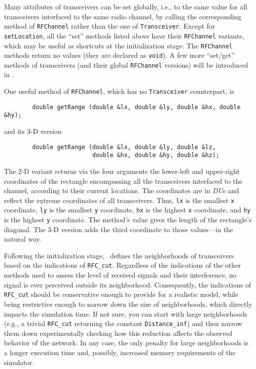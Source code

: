 Many attributes of transceivers can be set globally, i.e., to the same value
for all transceivers interfaced to the same radio channel, by calling the
corresponding method of {\tt RFChannel} rather than the one of
{\tt Transceiver}.
Except for {\tt setLocation}, all the ``set'' methods listed above
have their {\tt RFChannel} variants, which may be useful as shortcuts at the
initialization stage.
The {\tt RFChannel} methods return no values (they are declared as {\tt void}).
A few more ``set/get'' methods of transceivers (and their global 
{\tt RFChannel} versions) will be introduced in .

One useful method of {\tt RFChannel}, which has no
{\tt Transceiver} counterpart, is
\begin{verbatim}
        double getRange (double &lx, double &ly, double &hx, double &hy);
\end{verbatim}
\noindent
and its 3-D version
\begin{verbatim}
        double getRange (double &lx, double &ly, double &lz,
                         double &hx, double &hy, double &hz);
\end{verbatim}
\noindent
The 2-D variant
returns via the four arguments the lower-left and upper-right
coordinates of the rectangle encompassing all the transceivers interfaced
to the channel, according to their current locations.
The coordinates are in {\em DU\/}s and reflect the extreme coordinates of
all transceivers.
Thus, {\tt lx} is the smallest {\tt x} coordinate, {\tt ly} is the smallest
{\tt y} coordinate, {\tt hx} is the highest {\tt x} coordinate, and
{\tt hy} is the highest {\tt y} coordinate.
The method's value gives the length of the rectangle's diagonal.
The 3-D version adds the third coordinate to those values---in the
natural way.

Following the initialization stage, \smurph\ defines the neighborhoods of
transceivers based on the indications of {\tt RFC\_cut}.
Regardless of the indications of the other methods used to assess the level
of received signals and their interference, no signal is ever perceived
outside its neighborhood.
Consequently, the indications of {\tt RFC\_cut} should be conservative enough
to provide for a realistic model, while being restrictive enough to narrow
down the size of neighborhoods, which directly impacts the simulation time.
If not sure, you can start with large neighborhoods (e.g., a trivial
{\tt RFC\_cut} returning the constant {\tt Distance\_inf})
and then narrow them down experimentally checking how this reduction
affects the observed behavior of the network.
In any case, the only penalty for large neighborhoods is a longer
execution time and, possibly, increased memory requirements of the
simulator.

